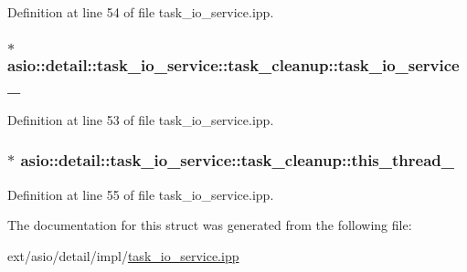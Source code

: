 Definition at line 54 of file task\+\_\+io\+\_\+service.\+ipp.

\hypertarget{structasio_1_1detail_1_1task__io__service_1_1task__cleanup_aaa5e81cb755ee9b4b59d4ba48d07c5ff}{}
\subsubsection[{task\+\_\+io\+\_\+service\+\_\+}]{$\ast$ asio\+::detail\+::task\+\_\+io\+\_\+service\+::task\+\_\+cleanup\+::task\+\_\+io\+\_\+service\+\_\+}\label{structasio_1_1detail_1_1task__io__service_1_1task__cleanup_aaa5e81cb755ee9b4b59d4ba48d07c5ff}


Definition at line 53 of file task\+\_\+io\+\_\+service.\+ipp.

\hypertarget{structasio_1_1detail_1_1task__io__service_1_1task__cleanup_a7168473fa48026929f6c6a5542c468d2}{}
\subsubsection[{this\+\_\+thread\+\_\+}]{$\ast$ asio\+::detail\+::task\+\_\+io\+\_\+service\+::task\+\_\+cleanup\+::this\+\_\+thread\+\_\+}\label{structasio_1_1detail_1_1task__io__service_1_1task__cleanup_a7168473fa48026929f6c6a5542c468d2}


Definition at line 55 of file task\+\_\+io\+\_\+service.\+ipp.



The documentation for this struct was generated from the following file\+:\begin{DoxyCompactItemize}
\item 
ext/asio/detail/impl/\hyperlink{task__io__service_8ipp}{task\+\_\+io\+\_\+service.\+ipp}\end{DoxyCompactItemize}
